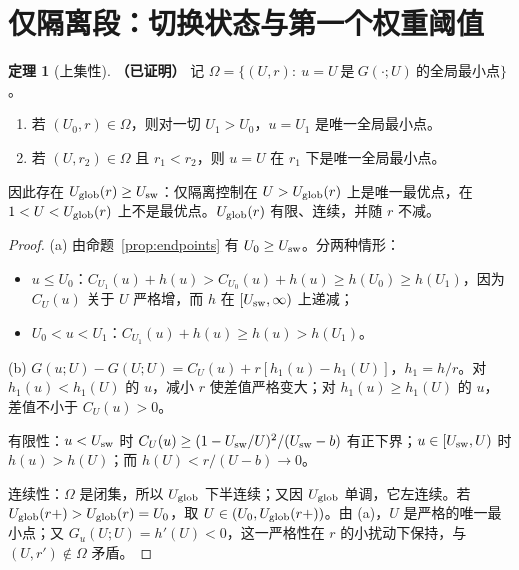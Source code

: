 \documentclass[11pt,a4paper]{ctexart}
\theoremstyle{definition}
\newtheorem{theorem}{定理}[section]
\theoremstyle{definition}
\newcommand{\Usw}{U_{\rm sw}}
\newcommand{\Uglob}{U_{\rm glob}}
\newcommand{\proven}{\textbf{（已证明）}}
\begin{document}
\section{仅隔离段：切换状态与第一个权重阈值}
\label{sec:front}

\begin{theorem}[上集性]\label{thm:upper}\proven
记 $\Omega=\{(U,r):\ u=U\ \text{是}\ G(\cdot;U)\ \text{的全局最小点}\}$。
\begin{enumerate}[label=(\alph*)]
\item 若 $(U_0,r)\in\Omega$，则对一切 $U_1>U_0$，$u=U_1$ 是唯一全局最小点。
\item 若 $(U,r_2)\in\Omega$ 且 $r_1<r_2$，则 $u=U$ 在 $r_1$ 下是唯一全局最小点。
\end{enumerate}
因此存在 $\Uglob(r)\ge\Usw$：仅隔离控制在 $U>\Uglob(r)$ 上是唯一最优点，在 $1<U<\Uglob(r)$ 上不是最优点。$\Uglob(r)$ 有限、连续，并随 $r$ 不减。
\end{theorem}
\begin{proof}
(a) 由命题~\ref{prop:endpoints} 有 $U_0\ge\Usw$。分两种情形：
\begin{itemize}
\item $u\le U_0$：$C_{U_1}(u)+h(u)>C_{U_0}(u)+h(u)\ge h(U_0)\ge h(U_1)$，因为 $C_U(u)$ 关于 $U$ 严格增，而 $h$ 在 $[\Usw,\infty)$ 上递减；
\item $U_0<u<U_1$：$C_{U_1}(u)+h(u)\ge h(u)>h(U_1)$。
\end{itemize}
(b) $G(u;U)-G(U;U)=C_U(u)+r[h_1(u)-h_1(U)]$，$h_1=h/r$。对 $h_1(u)<h_1(U)$ 的 $u$，减小 $r$ 使差值严格变大；对 $h_1(u)\ge h_1(U)$ 的 $u$，差值不小于 $C_U(u)>0$。

有限性：$u<\Usw$ 时 $C_U(u)\ge(1-\Usw/U)^2/(\Usw-b)$ 有正下界；$u\in[\Usw,U)$ 时 $h(u)>h(U)$；而 $h(U)<r/(U-b)\to0$。

连续性：$\Omega$ 是闭集，所以 $\Uglob$ 下半连续；又因 $\Uglob$ 单调，它左连续。若 $\Uglob(r+)>\Uglob(r)=U_0$，取 $U\in(U_0,\Uglob(r+))$。由 (a)，$U$ 是严格的唯一最小点；又 $G_u(U;U)=h'(U)<0$，这一严格性在 $r$ 的小扰动下保持，与 $(U,r')\notin\Omega$ 矛盾。
\end{proof}
\end{document}
